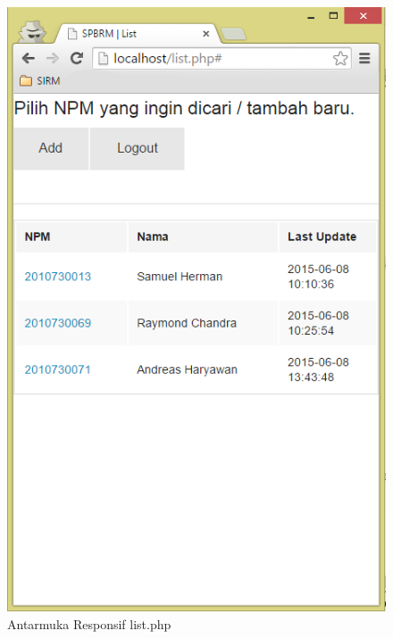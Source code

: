 \begin{figure}[H]
\centering
\includegraphics[scale=0.5]{Gambar/pengujian18.png}
\caption[Antarmuka Responsif list.php]{Antarmuka Responsif list.php} 
\label{fig:responsiflist}
\end{figure}

